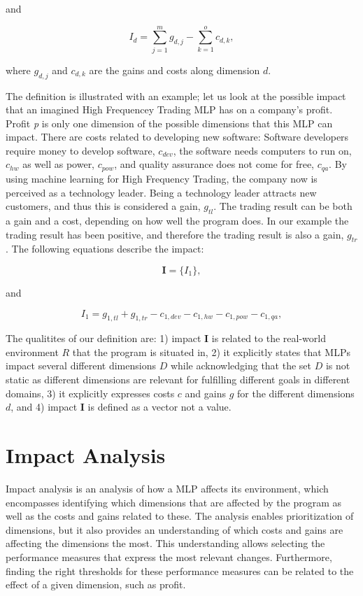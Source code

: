 \documentclass{article}
\begin{document}
and 

\begin{equation}
I_d=\sum_{j=1}^m g_{d,j} - \sum_{k=1}^o c_{d,k}, 
\end{equation}

where $g_{d,j}$ and $c_{d,k}$  are the gains and costs along dimension $d$.

The definition is illustrated with an example; let us look at the possible impact that an imagined High Frequencey Trading MLP has on a company's profit.
Profit \emph{p} is only one dimension of the possible dimensions that this MLP can impact.
There are costs related to developing new software: Software developers require money to develop software, $c_{dev}$, the software needs computers to run on, $c_{hw}$ as well as power, $c_{pow}$, and quality assurance does not come for free, $c_{qa}$.
By using machine learning for High Frequency Trading, the company now is perceived as a technology leader. 
Being a technology leader attracts new customers, and thus this is considered a gain, $g_{tl}$.
The trading result can be both a gain and a cost, depending on how well the program does.
In our example the trading result has been positive, and therefore the trading result is also a gain, $g_{tr}$.
The following equations describe the impact:

\begin{equation}
\textbf{I} =  \{I_1\},
\end{equation}

and 

\begin{equation}
I_1= g_{1,tl} + g_{1,tr} - c_{1,dev} - c_{1,hw} - c_{1,pow} - c_{1,qa},
\end{equation}

The qualitites of our definition are: 1) impact $\textbf{I}$ is related to the real-world environment $R$ that the program is situated in, 2) it explicitly states that MLPs impact several different dimensions $D$ while acknowledging that the set $D$ is not static as different dimensions are relevant for fulfilling different goals in different domains, 3) it explicitly expresses costs $c$ and gains $g$ for the different dimensions $d$, and 4) impact $\textbf{I}$ is defined as a vector not a value.

\section{Impact Analysis}
\label{sec:impact_analysis}
Impact analysis is an analysis of how a MLP affects its environment, which encompasses identifying which dimensions that are affected by the program as well as the costs and gains related to these.
The analysis enables prioritization of dimensions, but it also provides an understanding of which costs and gains are affecting the dimensions the most.
This understanding allows selecting the performance measures that express the most relevant changes.
Furthermore, finding the right thresholds for these performance measures can be related to the effect of a given dimension, such as profit.
\end{document}
